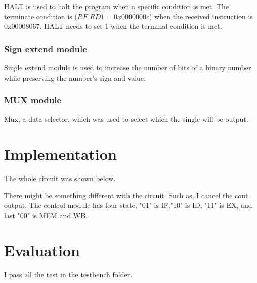 \documentclass[12pt,a4paper]{article}
\begin{document}
HALT is used to halt the program when a specific condition is met.
The terminate condition is ($RF\_ RD1 = 0x0000000c$) when the received instruction is 0x00008067. 
HALT needs to set 1 when the terminal condition is met.

\subsubsection{Sign extend module}

Single extend module is used to increase the number of bits of a binary number while preserving the number's sign and value. 

\subsubsection{MUX module}

Mux, a data selector, which was used to select which the single will be output.

\newpage

\section{Implementation}

The whole circuit was shown below.


There might be something different with the circuit.
Such as, I cancel the cout output.
The control module has four state, "01" is IF,"10" is ID, "11" is EX, and last "00" is MEM and WB.
\newpage

\section{Evaluation}

I pass all the test in the testbench folder.



\end{document}
